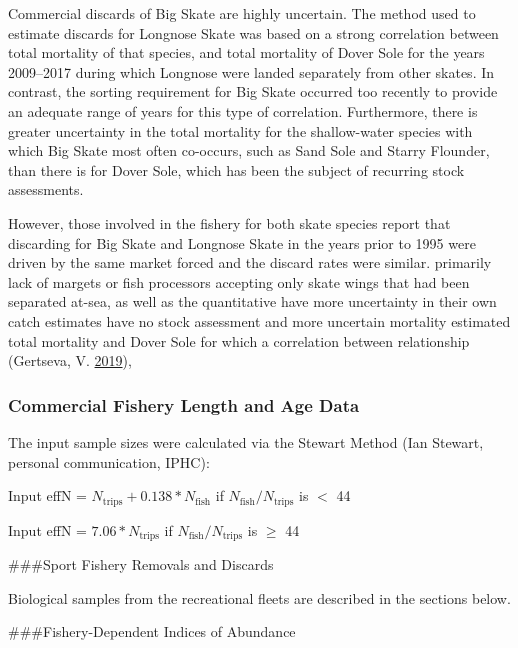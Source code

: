 \documentclass[12pt,]{article}
\begin{document}
Commercial discards of Big Skate are highly uncertain. The method used
to estimate discards for Longnose Skate was based on a strong
correlation between total mortality of that species, and total mortality
of Dover Sole for the years 2009--2017 during which Longnose were landed
separately from other skates. In contrast, the sorting requirement for
Big Skate occurred too recently to provide an adequate range of years
for this type of correlation. Furthermore, there is greater uncertainty
in the total mortality for the shallow-water species with which Big
Skate most often co-occurs, such as Sand Sole and Starry Flounder, than
there is for Dover Sole, which has been the subject of recurring stock
assessments.

However, those involved in the fishery for both skate species report
that discarding for Big Skate and Longnose Skate in the years prior to
1995 were driven by the same market forced and the discard rates were
similar. primarily lack of margets or fish processors accepting only
skate wings that had been separated at-sea, as well as the quantitative
have more uncertainty in their own catch estimates have no stock
assessment and more uncertain mortality estimated total mortality and
Dover Sole for which a correlation between relationship (Gertseva, V.
\protect\hyperlink{ref-Gertseva2019}{2019}),

\hypertarget{commercial-fishery-length-and-age-data}{%
\subsubsection{Commercial Fishery Length and Age
Data}\label{commercial-fishery-length-and-age-data}}

The input sample sizes were calculated via the Stewart Method (Ian
Stewart, personal communication, IPHC):

\begin{centering}

Input effN = $N_{\text{trips}} + 0.138 * N_{\text{fish}}$ if $N_{\text{fish}}/N_{\text{trips}}$ is $<$ 44

Input effN = $7.06 * N_{\text{trips}}$ if $N_{\text{fish}}/N_{\text{trips}}$ is $\geq$ 44

\end{centering}

\#\#\#Sport Fishery Removals and Discards

Biological samples from the recreational fleets are described in the
sections below.

\#\#\#Fishery-Dependent Indices of Abundance
\end{document}
